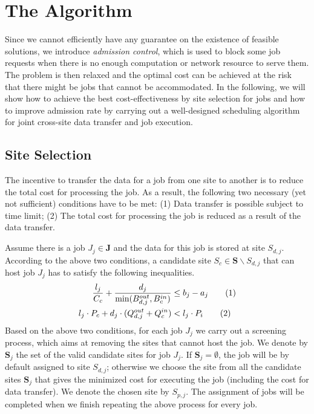 \documentclass{article}
\newcommand\numberthis{\addtocounter{equation}{1}\tag{\theequation}}
\begin{document}
\section{The Algorithm}
\label{sec:algo}

Since we cannot efficiently have any guarantee on the existence of feasible solutions, we introduce \textit{admission control}, which is used to block some job requests when there is no enough computation or network resource to serve them. The problem is then relaxed and the optimal cost can be achieved at the risk that there might be jobs that cannot be accommodated. In the following, we will show how to achieve the best cost-effectiveness by site selection for jobs and how to improve admission rate by carrying out a well-designed scheduling algorithm for joint cross-site data transfer and job execution.

\subsection{Site Selection}

The incentive to transfer the data for a job from one site to another is to reduce the total cost for processing the job. As a result, the following two necessary (yet not sufficient) conditions have to be met: (1) Data transfer is possible subject to time limit; (2) The total cost for processing the job is reduced as a result of the data transfer.

Assume there is a job $J_j \in \mathbf{J}$ and the data for this job is stored at site $S_{d,j}$. According to the above two conditions, a candidate site $S_c \in \mathbf{S} \backslash S_{d,j}$ that can host job $J_j$ has to satisfy the following inequalities.
\begin{align*}
\frac{l_j}{C_c} + \frac{d_j}{\min (B_{d,j}^{out}, B_c^{in})} & \leq  b_j - a_j \label{ineqn:deadline-constraint}\numberthis\\
l_j \cdot P_c + d_j \cdot (Q_{d,j}^{out} + Q_c^{in}) & <  l_j \cdot P_i \label{ineqn:cost-constraint}\numberthis
\end{align*}
Based on the above two conditions, for each job $J_j$ we carry out a screening process, which aims at removing the sites that cannot host the job. We denote by $\mathbf{S}_j$ the set of the valid candidate sites for job $J_j$. If $\mathbf{S}_j = \emptyset$, the job will be by default assigned to site $S_{d,j}$; otherwise we choose the site from all the candidate sites $\mathbf{S}_j$ that gives the minimized cost for executing the job (including the cost for data transfer). We denote the chosen site by $S_{p,j}$. The assignment of jobs will be completed when we finish repeating the above process for every job.
\end{document}
